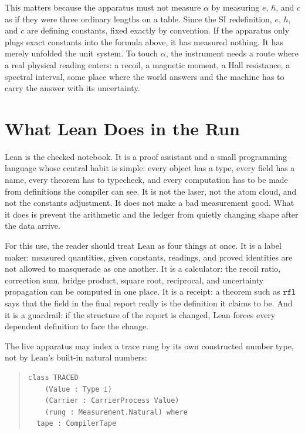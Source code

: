 This matters because the apparatus must not measure \(\alpha\) by measuring \(e\), \(\hbar\), and \(c\) as if
they were three ordinary lengths on a table. Since the SI redefinition, \(e\), \(h\), and \(c\) are defining
constants, fixed exactly by convention. If the apparatus only plugs exact constants into the formula above, it
has measured nothing. It has merely unfolded the unit system. To touch \(\alpha\), the instrument needs a route
where a real physical reading enters: a recoil, a magnetic moment, a Hall resistance, a spectral interval, some
place where the world answers and the machine has to carry the answer with its uncertainty.

\section{What Lean Does in the Run}

Lean is the checked notebook. It is a proof assistant and a small programming language whose central habit is
simple: every object has a type, every field has a name, every theorem has to typecheck, and every computation
has to be made from definitions the compiler can see. It is not the laser, not the atom cloud, and not the
constants adjustment. It does not make a bad measurement good. What it does is prevent the arithmetic and the
ledger from quietly changing shape after the data arrive.

For this use, the reader should treat Lean as four things at once. It is a label maker: measured quantities,
given constants, readings, and proved identities are not allowed to masquerade as one another. It is a calculator:
the recoil ratio, correction sum, bridge product, square root, reciprocal, and uncertainty propagation can be
computed in one place. It is a receipt: a theorem such as \(\texttt{rfl}\) says that the field in the final report
really is the definition it claims to be. And it is a guardrail: if the structure of the report is changed, Lean
forces every dependent definition to face the change.

The live apparatus may index a trace rung by its own constructed number type, not by Lean's built-in natural
numbers:

\begin{quote}\small
\begin{verbatim}
class TRACED
    (Value : Type i)
    (Carrier : CarrierProcess Value)
    (rung : Measurement.Natural) where
  tape : CompilerTape
\end{verbatim}
\end{quote}

